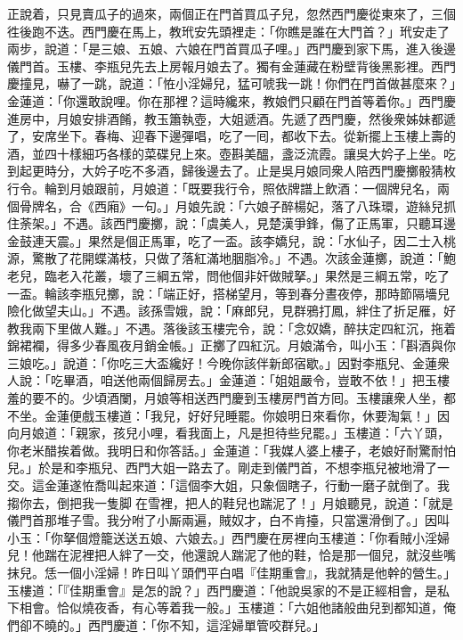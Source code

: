 正說着，只見賣瓜子的過來，{}兩個正在門首買瓜子兒，忽然西門慶從東來了，三個徃後跑不迭。西門慶在馬上，教玳安先頭裡走：「你瞧是誰在大門首？」玳安走了兩步，說道：「是三娘、五娘、六娘在門首買瓜子哩。」西門慶到家下馬，進入後邊儀門首。玉樓、李瓶兒先去上房報月娘去了。獨有金蓮藏在粉壁背後黑影裡。西門慶撞見，嚇了一跳，說道：「恠小淫婦兒，猛可唬我一跳！你們在門首做甚麼來？」金蓮道：「你還敢說哩。你在那裡？這時纔來，教娘們只顧在門首等着你。」西門慶進房中，月娘安排酒餚，教玉簫執壺，大姐遞酒。先遞了西門慶，然後衆姊妹都遞了，安席坐下。春梅、迎春下邊彈唱，吃了一囘，都收下去。從新擺上玉樓上壽的酒，並四十樣細巧各樣的菜碟兒上來。壺斟美醞，盞泛流霞。讓吳大妗子上坐。吃到起更時分，大妗子吃不多酒，歸後邊去了。止是吳月娘同衆人陪西門慶擲骰猜枚行令。輪到月娘跟前，月娘道：「既要我行令，照依牌譜上飲酒：一個牌兒名，兩個骨牌名，合《西廂》一句。」月娘先說：「六娘子醉楊妃，落了八珠環，遊絲兒抓住荼架。」不遇。該西門慶擲，說：「虞美人，見楚漢爭鋒，傷了正馬軍，只聽耳邊金鼓連天震。」果然是個正馬軍，吃了一盃。該李嬌兒，說：「水仙子，因二士入桃源，驚散了花開蝶滿枝，只做了落紅滿地胭脂冷。」不遇。次該金蓮擲，說道：「鮑老兒，臨老入花叢，壞了三綱五常，問他個非奸做賊拏。」{}果然是三綱五常，吃了一盃。輪該李瓶兒擲，說：「端正好，搭梯望月，等到春分晝夜停，那時節隔墻兒險化做望夫山。」不遇。該孫雪娥，說：「麻郎兒，見群鴉打鳳，絆住了折足雁，好教我兩下里做人難。」不遇。落後該玉樓完令，說：「念奴嬌，醉扶定四紅沉，拖着錦裙襴，得多少春風夜月銷金帳。」正擲了四紅沉。月娘滿令，叫小玉：「斟酒與你三娘吃。」說道：「你吃三大盃纔好！今晚你該伴新郎宿歇。」因對李瓶兒、金蓮衆人說：「吃畢酒，咱送他兩個歸房去。」金蓮道：「姐姐嚴令，豈敢不依！」把玉樓羞的要不的。少頃酒闌，月娘等相送西門慶到玉樓房門首方囘。玉樓讓衆人坐，都不坐。金蓮便戲玉樓道：「我兒，好好兒睡罷。你娘明日來看你，休要淘氣！」因向月娘道：「親家，孩兒小哩，看我面上，凡是担待些兒罷。」玉樓道：「六丫頭，你老米醋挨着做。我明日和你答話。」金蓮道：「我媒人婆上樓子，老娘好耐驚耐怕兒。」於是和李瓶兒、西門大姐一路去了。剛走到儀門首，不想李瓶兒被地滑了一交。這金蓮遂恠喬叫起來道：「這個李大姐，只象個瞎子，行動一磨子就倒了。我搊你去，倒把我一隻脚𨃓在雪裡，把人的鞋兒也踹泥了！」月娘聽見，說道：「就是儀門首那堆子雪。我分咐了小厮兩遍，賊奴才，白不肯擡，只當還滑倒了。」因叫小玉：「你拏個燈籠送送五娘、六娘去。」西門慶在房裡向玉樓道：「你看賊小淫婦兒！他踹在泥裡把人絆了一交，他還說人踹泥了他的鞋，恰是那一個兒，就沒些嘴抹兒。恁一個小淫婦！昨日叫丫頭們平白唱『佳期重會』，我就猜是他幹的營生。」玉樓道：「『佳期重會』是怎的說？」西門慶道：「他說吳家的不是正經相會，是私下相會。恰似燒夜香，有心等着我一般。」{}玉樓道：「六姐他諸般曲兒到都知道，俺們卻不曉的。」西門慶道：「你不知，這淫婦單管咬群兒。」

